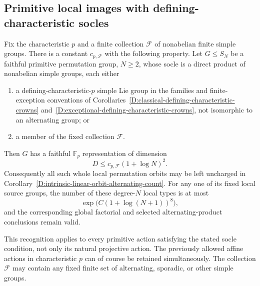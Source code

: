 \subsection{Primitive local images with defining-characteristic socles}

\begin{corollary}
\label{D:primitive-defining-characteristic-orbit-models}
Fix the characteristic $p$ and a finite collection $\mathcal F$
of nonabelian finite simple groups. There is a constant
$c_{p,\mathcal F}$ with the following property. Let $G\le S_N$
be a faithful primitive permutation group, $N\ge2$, whose socle
is a direct product of nonabelian simple groups, each either
\begin{enumerate}
\item a defining-characteristic-$p$ simple Lie group in the
      families and finite-exception conventions of
      Corollaries~\ref{D:classical-defining-characteristic-crowns}
      and~\ref{D:exceptional-defining-characteristic-crowns},
      not isomorphic to an alternating group; or
\item a member of the fixed collection $\mathcal F$.
\end{enumerate}
Then $G$ has a faithful $\mathbb F_p$ representation of dimension
\[
                  D\le c_{p,\mathcal F}(1+\log N)^2.       \tag{D.PM.1}
\]
Consequently all such whole local permutation orbits may be
left uncharged in
Corollary~\ref{D:intrinsic-linear-orbit-alternating-count}.
For any one of its fixed local source groups, the number of
these degree-$N$ local types is at most
\[
                 \exp\bigl(C(1+\log(N+1))^8\bigr),         \tag{D.PM.2}
\]
and the corresponding global factorial and selected
alternating-product conclusions remain valid.

This recognition applies to every primitive action satisfying
the stated socle condition, not only its natural projective
action. The previously allowed affine actions in characteristic
$p$ can of course be retained simultaneously. The collection
$\mathcal F$ may contain any fixed finite set of alternating,
sporadic, or other simple groups.
\end{corollary}

